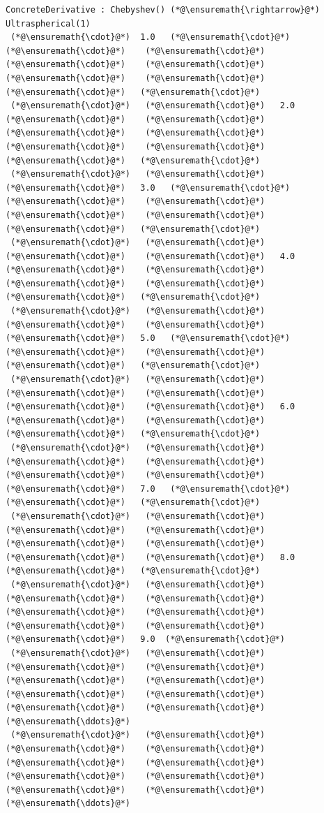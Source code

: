 \documentclass[12pt,a4paper]{article}
\begin{document}
\begin{lstlisting}
ConcreteDerivative : Chebyshev() (*@\ensuremath{\rightarrow}@*) Ultraspherical(1)
 (*@\ensuremath{\cdot}@*)  1.0   (*@\ensuremath{\cdot}@*)    (*@\ensuremath{\cdot}@*)    (*@\ensuremath{\cdot}@*)    (*@\ensuremath{\cdot}@*)    (*@\ensuremath{\cdot}@*)    (*@\ensuremath{\cdot}@*)    (*@\ensuremath{\cdot}@*)    (*@\ensuremath{\cdot}@*)   (*@\ensuremath{\cdot}@*)
 (*@\ensuremath{\cdot}@*)   (*@\ensuremath{\cdot}@*)   2.0   (*@\ensuremath{\cdot}@*)    (*@\ensuremath{\cdot}@*)    (*@\ensuremath{\cdot}@*)    (*@\ensuremath{\cdot}@*)    (*@\ensuremath{\cdot}@*)    (*@\ensuremath{\cdot}@*)    (*@\ensuremath{\cdot}@*)   (*@\ensuremath{\cdot}@*)
 (*@\ensuremath{\cdot}@*)   (*@\ensuremath{\cdot}@*)    (*@\ensuremath{\cdot}@*)   3.0   (*@\ensuremath{\cdot}@*)    (*@\ensuremath{\cdot}@*)    (*@\ensuremath{\cdot}@*)    (*@\ensuremath{\cdot}@*)    (*@\ensuremath{\cdot}@*)    (*@\ensuremath{\cdot}@*)   (*@\ensuremath{\cdot}@*)
 (*@\ensuremath{\cdot}@*)   (*@\ensuremath{\cdot}@*)    (*@\ensuremath{\cdot}@*)    (*@\ensuremath{\cdot}@*)   4.0   (*@\ensuremath{\cdot}@*)    (*@\ensuremath{\cdot}@*)    (*@\ensuremath{\cdot}@*)    (*@\ensuremath{\cdot}@*)    (*@\ensuremath{\cdot}@*)   (*@\ensuremath{\cdot}@*)
 (*@\ensuremath{\cdot}@*)   (*@\ensuremath{\cdot}@*)    (*@\ensuremath{\cdot}@*)    (*@\ensuremath{\cdot}@*)    (*@\ensuremath{\cdot}@*)   5.0   (*@\ensuremath{\cdot}@*)    (*@\ensuremath{\cdot}@*)    (*@\ensuremath{\cdot}@*)    (*@\ensuremath{\cdot}@*)   (*@\ensuremath{\cdot}@*)
 (*@\ensuremath{\cdot}@*)   (*@\ensuremath{\cdot}@*)    (*@\ensuremath{\cdot}@*)    (*@\ensuremath{\cdot}@*)    (*@\ensuremath{\cdot}@*)    (*@\ensuremath{\cdot}@*)   6.0   (*@\ensuremath{\cdot}@*)    (*@\ensuremath{\cdot}@*)    (*@\ensuremath{\cdot}@*)   (*@\ensuremath{\cdot}@*)
 (*@\ensuremath{\cdot}@*)   (*@\ensuremath{\cdot}@*)    (*@\ensuremath{\cdot}@*)    (*@\ensuremath{\cdot}@*)    (*@\ensuremath{\cdot}@*)    (*@\ensuremath{\cdot}@*)    (*@\ensuremath{\cdot}@*)   7.0   (*@\ensuremath{\cdot}@*)    (*@\ensuremath{\cdot}@*)   (*@\ensuremath{\cdot}@*)
 (*@\ensuremath{\cdot}@*)   (*@\ensuremath{\cdot}@*)    (*@\ensuremath{\cdot}@*)    (*@\ensuremath{\cdot}@*)    (*@\ensuremath{\cdot}@*)    (*@\ensuremath{\cdot}@*)    (*@\ensuremath{\cdot}@*)    (*@\ensuremath{\cdot}@*)   8.0   (*@\ensuremath{\cdot}@*)   (*@\ensuremath{\cdot}@*)
 (*@\ensuremath{\cdot}@*)   (*@\ensuremath{\cdot}@*)    (*@\ensuremath{\cdot}@*)    (*@\ensuremath{\cdot}@*)    (*@\ensuremath{\cdot}@*)    (*@\ensuremath{\cdot}@*)    (*@\ensuremath{\cdot}@*)    (*@\ensuremath{\cdot}@*)    (*@\ensuremath{\cdot}@*)   9.0  (*@\ensuremath{\cdot}@*)
 (*@\ensuremath{\cdot}@*)   (*@\ensuremath{\cdot}@*)    (*@\ensuremath{\cdot}@*)    (*@\ensuremath{\cdot}@*)    (*@\ensuremath{\cdot}@*)    (*@\ensuremath{\cdot}@*)    (*@\ensuremath{\cdot}@*)    (*@\ensuremath{\cdot}@*)    (*@\ensuremath{\cdot}@*)    (*@\ensuremath{\cdot}@*)   (*@\ensuremath{\ddots}@*)
 (*@\ensuremath{\cdot}@*)   (*@\ensuremath{\cdot}@*)    (*@\ensuremath{\cdot}@*)    (*@\ensuremath{\cdot}@*)    (*@\ensuremath{\cdot}@*)    (*@\ensuremath{\cdot}@*)    (*@\ensuremath{\cdot}@*)    (*@\ensuremath{\cdot}@*)    (*@\ensuremath{\cdot}@*)    (*@\ensuremath{\cdot}@*)   (*@\ensuremath{\ddots}@*)
\end{lstlisting}
\end{document}

